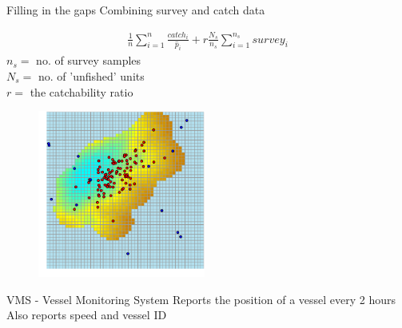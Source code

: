 \documentclass{beamer}
\begin{document}
\begin{frame}{Filling in the gaps}
Combining survey and catch data\\
\begin{minipage}{0.4\textwidth}
  \begin{flushleft}
    \begin{align*}
      \frac{1}{n} \sum_{i=1}^n \frac{catch_i}{\hat{p}_i} + 
      r \frac{N_s}{n_s} \sum_{i=1}^{n_s} survey_i
    \end{align*}
    \vspace{6pt}
    $n_s =$ no. of survey samples \\
    $N_s =$ no. of 'unfished' units \\
    $r =$ the catchability ratio
  \end{flushleft}
\end{minipage}
\hspace{0.5cm}
\begin{minipage}{0.4\textwidth}
  \begin{figure}
    \centering
    \includegraphics[width=5.5cm]{fig8}
  \end{figure}
\end{minipage}
\end{frame}


\begin{frame}{VMS - Vessel Monitoring System}
  Reports the position of a vessel every 2 hours \\
  Also reports speed and vessel ID
  
\end{frame}
\end{document}
